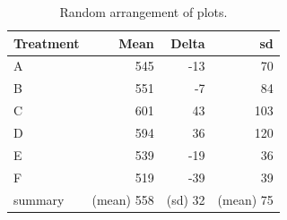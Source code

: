 \documentclass[landscape]{article}
\begin{document}
  \begin{table}[ht]
    \centering
    \begin{tabular}{lrrr}
      \toprule
      Treatment & Mean & Delta & sd \\
      \midrule
      A       & 545        & -13     & 70 \\
      B       & 551        & -7      & 84 \\
      C       & 601        & 43      & 103 \\
      D       & 594        & 36      & 120 \\
      E       & 539        & -19     & 36 \\
      F       & 519        & -39     & 39 \\
      \midrule
      summary & (mean) 558 & (sd) 32 & (mean) 75 \\
      \bottomrule
    \end{tabular}
    \caption{Random arrangement of plots.}
  \end{table}
\end{document}
